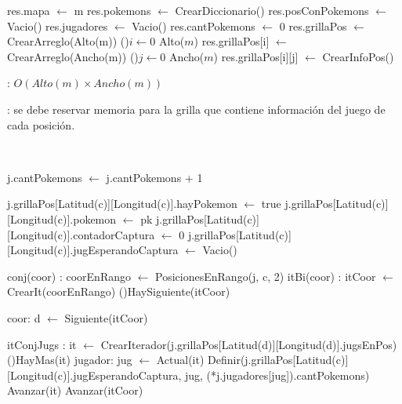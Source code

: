 \begin{Algoritmos}


	\begin{algorithm}[H]
		\NoCaptionOfAlgo
		\caption{}
		res.mapa $\leftarrow$ m
		res.pokemons $\leftarrow$ CrearDiccionario()
		res.posConPokemons $\leftarrow$ Vacio()
		res.jugadores $\leftarrow$ Vacio()
		res.cantPokemons $\leftarrow$ 0
		res.grillaPos $\leftarrow$ CrearArreglo(Alto(m))
		\For(){$i \leftarrow 0$ \KwTo Alto($m$)}{
			res.grillaPos[i] $\leftarrow$ CrearArreglo(Ancho(m))
			\For(){$j \leftarrow 0$ \KwTo Ancho($m$)}{
				res.grillaPos[i][j] $\leftarrow$ CrearInfoPos()
			}
		}
	\end{algorithm}

	\complejidad: $O(Alto(m) \times Ancho(m))$

	\justifcomp: se debe reservar memoria para la grilla que contiene información del juego de cada posición.

	~

	\begin{algorithm}[H]
		\NoCaptionOfAlgo
		\caption{}
		j.cantPokemons $\leftarrow$ j.cantPokemons + 1

		j.grillaPos[Latitud(c)][Longitud(c)].hayPokemon $\leftarrow$ true
		j.grillaPos[Latitud(c)][Longitud(c)].pokemon $\leftarrow$ pk
		j.grillaPos[Latitud(c)][Longitud(c)].contadorCaptura $\leftarrow$ 0
		j.grillaPos[Latitud(c)][Longitud(c)].jugEsperandoCaptura $\leftarrow$ Vacio()

		conj(coor) : coorEnRango $\leftarrow$ PosicionesEnRango(j, c, 2)
		itBi(coor) : itCoor $\leftarrow$ CrearIt(coorEnRango)
		\While(){HaySiguiente(itCoor)}{
			coor: d $\leftarrow$ Siguiente(itCoor)

			itConjJugs : it $\leftarrow$ CrearIterador(j.grillaPos[Latitud(d)][Longitud(d)].jugsEnPos)
			\While(){HayMas(it)}{
				jugador: jug $\leftarrow$ Actual(it)
				Definir(j.grillaPos[Latitud(c)][Longitud(c)].jugEsperandoCaptura, jug, (*j.jugadores[jug]).cantPokemons)
				Avanzar(it)
			}
			Avanzar(itCoor)
		}
	\end{algorithm}


\end{Algoritmos}
